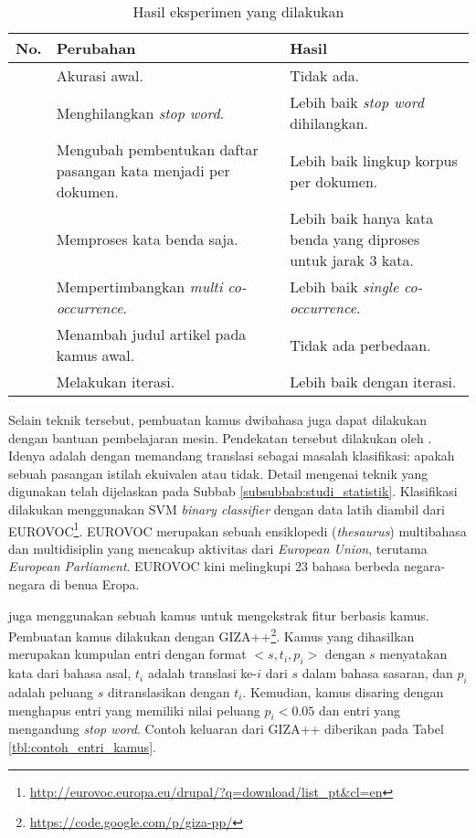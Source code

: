 \documentclass[../main/main.tex]{subfiles}
\begin{document}
\begin{table}[htbp]
	\centering
	\caption{Hasil eksperimen yang dilakukan \textcite{limanthie}}
	\label{tbl:studi_eksperimen_limanthie}
	\begin{tabular}{|r|p{}|p{}|}
		\hline
		\textbf{No.} & \textbf{Perubahan} & \textbf{Hasil}\\ \hline
		\tableitem & Akurasi awal. & Tidak ada.\\ \hline
		\tableitem & Menghilangkan \textit{stop word}. & Lebih baik \textit{stop word} dihilangkan.\\ \hline
		\tableitem & Mengubah pembentukan daftar pasangan kata menjadi per dokumen. & Lebih baik lingkup korpus per dokumen.\\ \hline
		\tableitem & Memproses kata benda saja. & Lebih baik hanya kata benda yang diproses untuk jarak 3 kata.\\ \hline
		\tableitem & Mempertimbangkan \textit{multi co-occurrence}. & Lebih baik \textit{single co-occurrence}.\\ \hline
		\tableitem & Menambah judul artikel pada kamus awal. & Tidak ada perbedaan.\\ \hline
		\tableitem & Melakukan iterasi. & Lebih baik dengan iterasi.\\ \hline
	\end{tabular}
\end{table}

Selain teknik tersebut, pembuatan kamus dwibahasa juga dapat dilakukan dengan bantuan pembelajaran mesin. Pendekatan tersebut dilakukan oleh \textcite{aker}. Idenya adalah dengan memandang translasi sebagai masalah klasifikasi: apakah sebuah pasangan istilah ekuivalen atau tidak. Detail mengenai teknik yang digunakan \textcite{aker} telah dijelaskan pada Subbab \ref{subsubbab:studi_statistik}. Klasifikasi dilakukan menggunakan SVM \textit{binary classifier} dengan data latih diambil dari EUROVOC\footnote{\url{http://eurovoc.europa.eu/drupal/?q=download/list_pt&cl=en}}. EUROVOC merupakan sebuah ensiklopedi (\textit{thesaurus}) multibahasa dan multidisiplin yang mencakup aktivitas dari \textit{European Union}, terutama \textit{European Parliament}. EUROVOC kini melingkupi 23 bahasa berbeda negara-negara di benua Eropa.

\textcite{aker} juga menggunakan sebuah kamus untuk mengekstrak fitur berbasis kamus. Pembuatan kamus dilakukan dengan GIZA++\footnote{\url{https://code.google.com/p/giza-pp/}}. Kamus yang dihasilkan merupakan kumpulan entri dengan format $<s, t_i, p_i>$ dengan $s$ menyatakan kata dari bahasa asal, $t_i$ adalah translasi ke-$i$ dari $s$ dalam bahasa sasaran, dan $p_i$ adalah peluang $s$ ditranslasikan dengan $t_i$. Kemudian, kamus disaring dengan menghapus entri yang memiliki nilai peluang $p_i < 0.05$ dan entri yang mengandung \textit{stop word}. Contoh keluaran dari GIZA++ diberikan pada Tabel \ref{tbl:contoh_entri_kamus}.
\end{document}
